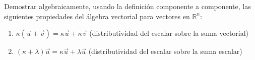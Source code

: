 Demostrar algebraicamente, usando la definición componente a componente, las siguientes propiedades del álgebra vectorial para vectores en $\mathbb{R}^n$:
\begin{enumerate}
    \item $\kappa(\vec{u} + \vec{v}) = \kappa\vec{u} + \kappa\vec{v}$ \quad (distributividad del escalar sobre la suma vectorial)
    \item $(\kappa + \lambda)\vec{u} = \kappa\vec{u} + \lambda\vec{u}$ \quad (distributividad del escalar sobre la suma escalar)
\end{enumerate}